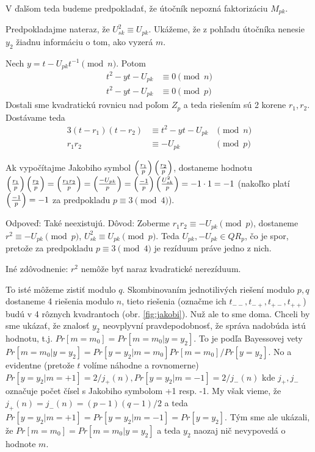 V ďalšom teda budeme predpokladať, že útočník nepozná faktorizáciu $M_{pk}$.

Predpokladajme nateraz, že $U_{sk}^2 \equiv U_{pk}$.
Ukážeme, že z pohľadu útočníka nenesie $y_2$ žiadnu informáciu o tom, ako
vyzerá $m$.

Nech $y = t - U_{pk} t^{-1} \pmod{n}$.
Potom
\begin{align*}
    t^2 - y t - U_{pk} &\equiv 0 \pmod{n} \\
    t^2 - y t - U_{pk} &\equiv 0 \pmod{p}
\end{align*}
Dostali sme kvadratickú rovnicu nad poľom $Z_p$ a teda riešením sú 2 korene
$r_1,r_2$.
Dostávame teda
\begin{alignat*}{3}
    (t-r_1)(t-r_2) &\equiv t^2 - y t - U_{pk} &\pmod{n}\\
    r_1 r_2 &\equiv -U_{pk} &\pmod{p}
\end{alignat*}

Ak vypočítajme Jakobiho symbol $\left( \frac{r_1}{p} \right) \left( \frac{r_2}{p} \right)$,
dostaneme hodnotu $\left( \frac{r_1}{p} \right)\left( \frac{r_2}{p} \right) = \left( \frac{r_1 r_2}{p} \right) =
\left( \frac{-U_{pk}}{p} \right) = \left( \frac{-1}{p} \right) \left( \frac{U_{sk}^2}{p} \right)=-1\cdot 1=-1$
(nakoľko platí $\left( \frac{-1}{p} \right)=-1$ za predpokladu $p \equiv 3 \pmod{4}$).

\begin{poznamka}
    Odpoveď: Také neexistujú. Dôvod:
    Zoberme $r_1 r_2 \equiv -U_{pk} \pmod{p}$, dostaneme $r^2 \equiv
    -U_{pk} \pmod{p}$, $U_{sk}^2 \equiv U_{pk} \pmod{p}$. Teda
    $U_{pk}, -U_{pk} \in QR_p$, čo je spor, pretože za predpokladu 
    $p\equiv 3 \pmod{4}$ je rezíduum práve jedno z nich.

    Iné zdôvodnenie: $r^2$ nemôže byť naraz kvadratické nerezíduum.
\end{poznamka}

To isté môžeme zistiť modulo $q$.
Skombinovaním jednotilivých riešení modulo $p,q$ dostaneme 4 riešenia
modulo $n$, tieto riešenia (označme ich $t_{--}, t_{-+}, t_{+-},
t_{++}$) budú v 4 rôznych kvadrantoch 
(obr. \ref{fig:jakobi}). Nuž ale to sme doma.
Chceli by sme ukázať, že znalosť $y_2$ neovplyvní pravdepodobnosť, že
správa nadobúda istú hodnotu, t.j.
$Pr[m=m_0]=Pr[m=m_0 | y=y_2]$.
To je podľa Bayessovej vety
$Pr[m=m_0 | y=y_2] = Pr[y=y_2 | m=m_0] Pr[m=m_0] / Pr[y=y_2]$.
No a evidentne (pretože $t$ volíme náhodne a rovnomerne)
$Pr[y=y_2 | m=+1] =2/j_{+}(n), Pr[y=y_2 | m=-1] = 2/j_{-}(n)$
kde $j_{+},j_{-}$ označuje počet čísel s Jakobiho symbolom
+1 resp. -1. 
My však vieme, že $j_{+}(n) = j_{-}(n) = (p-1)(q-1)/2$ a teda
$Pr[y=y_2| m=+1] = Pr[y=y_2 | m=-1] = Pr[y=y_2]$. Tým sme ale ukázali,
že $Pr[m=m_0] = Pr[m=m_0 | y=y_2]$ a teda $y_2$ naozaj nič nevypovedá
o hodnote $m$.

